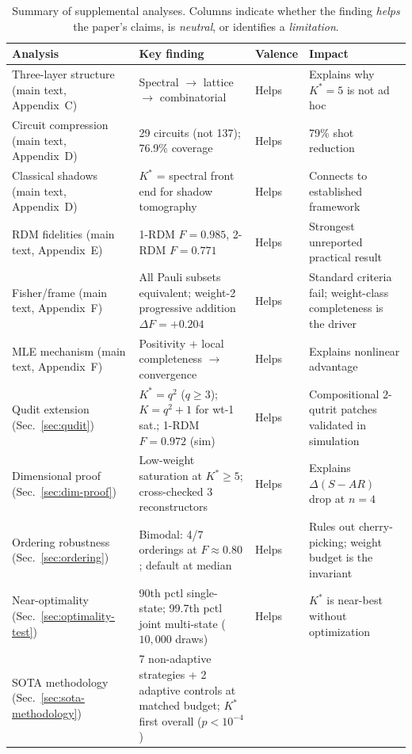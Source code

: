 \documentclass[twocolumn,prx,aps,superscriptaddress,longbibliography]{revtex4-2}
\begin{document}
\begin{table}
\caption{Summary of supplemental analyses.  Columns indicate
whether the finding \emph{helps} the paper's claims, is
\emph{neutral}, or identifies a \emph{limitation}.}
\label{tab:sm-summary}
\begin{ruledtabular}
\begin{tabular}{p{}p{}lp{}}
Analysis & Key finding & Valence & Impact \\
\hline
Three-layer structure (main text, Appendix~C)
  & Spectral $\to$ lattice $\to$ combinatorial
  & Helps & Explains why $K^* = 5$ is not ad hoc \\
Circuit compression (main text, Appendix~D)
  & 29 circuits (not 137); 76.9\% coverage
  & Helps & 79\% shot reduction \\
Classical shadows (main text, Appendix~D)
  & $K^*$ = spectral front end for shadow tomography
  & Helps & Connects to established framework \\
RDM fidelities (main text, Appendix~E)
  & 1-RDM $F = 0.985$, 2-RDM $F = 0.771$
  & Helps & Strongest unreported practical result \\
Fisher/frame (main text, Appendix~F)
  & All Pauli subsets equivalent; weight-2 progressive addition $\Delta F = +0.204$
  & Helps & Standard criteria fail; weight-class completeness is the driver \\
MLE mechanism (main text, Appendix~F)
  & Positivity $+$ local completeness $\to$ convergence
  & Helps & Explains nonlinear advantage \\
Qudit extension (Sec.~\ref{sec:qudit})
  & $K^* = q^2$ ($q \ge 3$); $K = q^2{+}1$ for wt-1 sat.; 1-RDM $F = 0.972$ (sim)
  & Helps & Compositional $2$-qutrit patches validated in simulation \\
Dimensional proof (Sec.~\ref{sec:dim-proof})
  & Low-weight saturation at $K^* \geq 5$; cross-checked 3 reconstructors
  & Helps & Explains $\Delta(S{-}AR)$ drop at $n = 4$ \\
Ordering robustness (Sec.~\ref{sec:ordering})
  & Bimodal: 4/7 orderings at $F \approx 0.80$; default at median
  & Helps & Rules out cherry-picking; weight budget is the invariant \\
Near-optimality (Sec.~\ref{sec:optimality-test})
  & 90th pctl single-state; 99.7th pctl joint multi-state ($10{,}000$ draws)
  & Helps & $K^*$ is near-best without optimization \\
SOTA methodology (Sec.~\ref{sec:sota-methodology})
  & 7 non-adaptive strategies + 2 adaptive controls at matched budget; $K^*$ first overall ($p < 10^{-4}$)

\end{tabular}
\end{ruledtabular}
\end{table}
\end{document}
